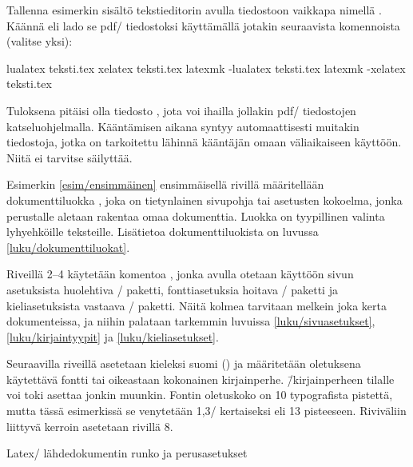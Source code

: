 Tallenna esimerkin sisältö tekstieditorin avulla tiedostoon vaikkapa
nimellä . Käännä eli lado se pdf\-/ tiedostoksi
käyttämällä jotakin seuraavista komennoista (valitse yksi):

\begin{koodilohkosis}
lualatex teksti.tex
xelatex  teksti.tex
latexmk -lualatex teksti.tex
latexmk -xelatex  teksti.tex
\end{koodilohkosis}

\noindent
Tuloksena pitäisi olla tiedosto , jota voi
ihailla jollakin pdf\-/ tiedostojen katseluohjelmalla. Kääntämisen
aikana syntyy automaattisesti muitakin tiedostoja, jotka on tarkoitettu
lähinnä kääntäjän omaan väliaikaiseen käyttöön. Niitä ei tarvitse
säilyttää.

Esimerkin \ref{esim/ensimmäinen} ensimmäisellä rivillä määritellään
dokumenttiluokka , joka on tietynlainen sivupohja tai
asetusten kokoelma, jonka perustalle aletaan rakentaa omaa dokumenttia.
Luokka  on tyypillinen valinta lyhyehköille teksteille.
Lisätietoa dokumenttiluokista on luvussa \ref{luku/dokumenttiluokat}.

Riveillä 2--4 käytetään komentoa , jonka avulla
otetaan käyttöön sivun asetuksista huolehtiva \-/
paketti, fonttiasetuksia hoitava \-/ paketti ja
kieliasetuksista vastaava \-/ paketti. Näitä kolmea
tarvitaan melkein joka kerta dokumenteissa, ja niihin palataan tarkemmin
luvuissa \ref{luku/sivuasetukset}, \ref{luku/kirjaintyypit} ja
\ref{luku/kieliasetukset}.

Seuraavilla riveillä asetetaan kieleksi suomi () ja
määritetään oletuksena käytettävä fontti tai oikeastaan kokonainen
kirjainperhe.  \=/kirjainperheen tilalle
voi toki asettaa jonkin muunkin. Fontin oletuskoko on 10 typografista
pistettä, mutta tässä esimerkissä se venytetään 1,3\-/ kertaiseksi eli
13 pisteeseen. Riviväliin liittyvä kerroin asetetaan rivillä 8.

\begin{esimerkki*}

  \caption{Latex\-/ lähdedokumentin runko ja perusasetukset}
  \label{esim/ensimmäinen}
\end{esimerkki*}

